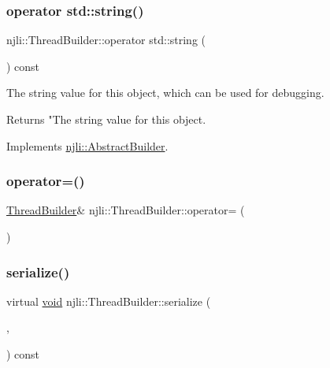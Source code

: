 \subsubsection{\texorpdfstring{operator std\+::string()}{operator std::string()}}
{\footnotesize\ttfamily njli\+::\+Thread\+Builder\+::operator std\+::string (\begin{DoxyParamCaption}{ }\end{DoxyParamCaption}) const\hspace{0.3cm}{\ttfamily [virtual]}}

The string value for this object, which can be used for debugging.

\begin{DoxyReturn}{Returns}
"The string value for this object. 
\end{DoxyReturn}


Implements \mbox{\hyperlink{classnjli_1_1_abstract_builder_a3e6e553e06d1ca30517ad5fb0bd4d000}{njli\+::\+Abstract\+Builder}}.

\mbox{\label{classnjli_1_1_thread_builder_af415f719c34b3251f66a2de69a7456ac}} 
\subsubsection{\texorpdfstring{operator=()}{operator=()}}
{\footnotesize\ttfamily \mbox{\hyperlink{classnjli_1_1_thread_builder}{Thread\+Builder}}\& njli\+::\+Thread\+Builder\+::operator= (\begin{DoxyParamCaption}\item[{const \mbox{\hyperlink{classnjli_1_1_thread_builder}{Thread\+Builder}} \&}]{ }\end{DoxyParamCaption})\hspace{0.3cm}{\ttfamily [protected]}}

\mbox{\label{classnjli_1_1_thread_builder_a62c78b29c46d7df9b7716240d0cbeaec}} 
\subsubsection{\texorpdfstring{serialize()}{serialize()}}
{\footnotesize\ttfamily virtual \mbox{\hyperlink{_thread_8h_af1e856da2e658414cb2456cb6f7ebc66}{void}} njli\+::\+Thread\+Builder\+::serialize (\begin{DoxyParamCaption}\item[{\mbox{\hyperlink{_thread_8h_af1e856da2e658414cb2456cb6f7ebc66}{void}} $\ast$}]{,  }\item[{bt\+Serializer $\ast$}]{ }\end{DoxyParamCaption}) const\hspace{0.3cm}{\ttfamily [virtual]}}

